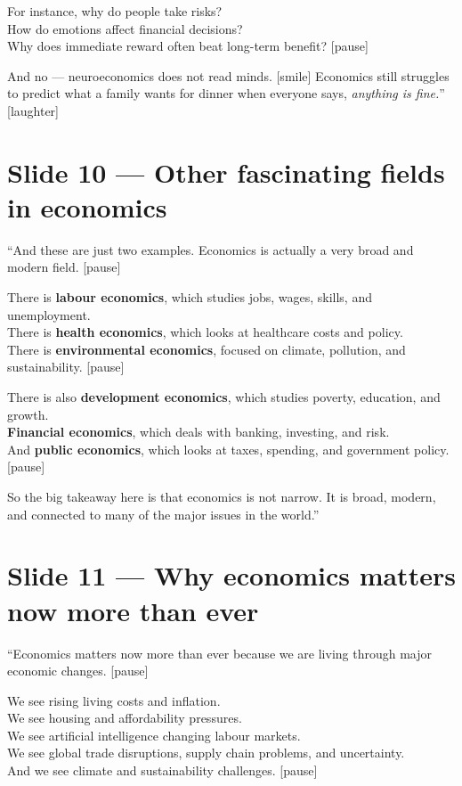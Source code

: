 \documentclass[12pt]{article}
\begin{document}
For instance, why do people take risks?\\
How do emotions affect financial decisions?\\
Why does immediate reward often beat long-term benefit? [pause]

And no --- neuroeconomics does not read minds. [smile] Economics still struggles to predict what a family wants for dinner when everyone says, \textit{anything is fine.}'' [laughter]

\section*{Slide 10 --- Other fascinating fields in economics}

``And these are just two examples. Economics is actually a very broad and modern field. [pause]

There is \textbf{labour economics}, which studies jobs, wages, skills, and unemployment.\\
There is \textbf{health economics}, which looks at healthcare costs and policy.\\
There is \textbf{environmental economics}, focused on climate, pollution, and sustainability. [pause]

There is also \textbf{development economics}, which studies poverty, education, and growth.\\
\textbf{Financial economics}, which deals with banking, investing, and risk.\\
And \textbf{public economics}, which looks at taxes, spending, and government policy. [pause]

So the big takeaway here is that economics is not narrow. It is broad, modern, and connected to many of the major issues in the world.''
\newpage
\section*{Slide 11 --- Why economics matters now more than ever}

``Economics matters now more than ever because we are living through major economic changes. [pause]

We see rising living costs and inflation.\\
We see housing and affordability pressures.\\
We see artificial intelligence changing labour markets.\\
We see global trade disruptions, supply chain problems, and uncertainty.\\
And we see climate and sustainability challenges. [pause]
\end{document}
